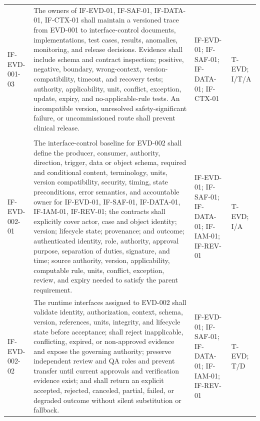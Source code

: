\documentclass[11pt,letterpaper]{article}
\begin{document}
\begin{scriptsize}
\begin{longtable}{@{}L{0.14\textwidth}L{0.49\textwidth}L{0.19\textwidth}L{0.10\textwidth}@{}}
\addlinespace[2pt]
\mbox{IF-EVD-001-03} & The owners of IF-EVD-01, IF-SAF-01, IF-DATA-01, IF-CTX-01 shall maintain a versioned trace from EVD-001 to interface-control documents, implementations, test cases, results, anomalies, monitoring, and release decisions. Evidence shall include schema and contract inspection; positive, negative, boundary, wrong-context, version-compatibility, timeout, and recovery tests; authority, applicability, unit, conflict, exception, update, expiry, and no-applicable-rule tests. An incompatible version, unresolved safety-significant failure, or uncommissioned route shall prevent clinical release. & IF-EVD-01; IF-SAF-01; IF-DATA-01; IF-CTX-01 & T-EVD; I\slash\allowbreak{}T\slash\allowbreak{}A \\
\addlinespace[2pt]
 \\
\addlinespace[2pt]
\mbox{IF-EVD-002-01} & The interface-control baseline for EVD-002 shall define the producer, consumer, authority, direction, trigger, data or object schema, required and conditional content, terminology, units, version compatibility, security, timing, state preconditions, error semantics, and accountable owner for IF-EVD-01, IF-SAF-01, IF-DATA-01, IF-IAM-01, IF-REV-01; the contracts shall explicitly cover actor, case and object identity; version; lifecycle state; provenance; and outcome; authenticated identity, role, authority, approval purpose, separation of duties, signature, and time; source authority, version, applicability, computable rule, units, conflict, exception, review, and expiry needed to satisfy the parent requirement. & IF-EVD-01; IF-SAF-01; IF-DATA-01; IF-IAM-01; IF-REV-01 & T-EVD; I\slash\allowbreak{}A \\
\addlinespace[2pt]
\mbox{IF-EVD-002-02} & The runtime interfaces assigned to EVD-002 shall validate identity, authorization, context, schema, version, references, units, integrity, and lifecycle state before acceptance; shall reject inapplicable, conflicting, expired, or non-approved evidence and expose the governing authority; preserve independent review and QA roles and prevent transfer until current approvals and verification evidence exist; and shall return an explicit accepted, rejected, canceled, partial, failed, or degraded outcome without silent substitution or fallback. & IF-EVD-01; IF-SAF-01; IF-DATA-01; IF-IAM-01; IF-REV-01 & T-EVD; T\slash\allowbreak{}D \\

\end{longtable}
\end{scriptsize}
\end{document}
